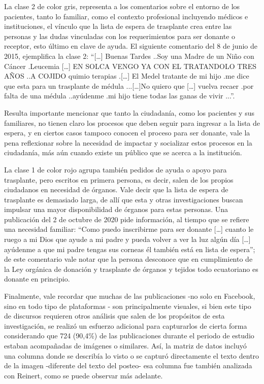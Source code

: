 \documentclass[spanish]{textolivre}
\begin{document}
La clase 2 de color gris, representa a los comentarios sobre el entorno de los pacientes, tanto lo familiar, como el contexto profesional incluyendo médicos e instituciones, el vínculo que la lista de espera de trasplante crea entre las personas y las dudas vinculadas con los requerimientos para ser donante o receptor, esto último en clave de ayuda. El siguiente comentario del 8 de junio de 2015, ejemplifica la clase 2: “[…] Buenas Tardes ..Soy una Madre de un Niño con Cáncer .Leucemia […] EN SOLCA VENGO YA CON EL TRATANDOLO TRES AÑOS ..A COJIDO quimio terapias .[…] El Medel tratante de mi hijo .me dice que esta para un trasplante de médula ...[…]No quiero que […] vuelva recaer .por falta de una médula ..ayúdenme .mi hijo tiene todas las ganas de vivir ...”.

Resulta importante mencionar que tanto la ciudadanía, como los pacientes y sus familiares, no tienen claro los procesos que deben seguir para ingresar a la lista de espera, y en ciertos casos tampoco conocen el proceso para ser donante, vale la pena reflexionar sobre la necesidad de impactar y socializar estos procesos en la ciudadanía, más aún cuando existe un público que se acerca a la institución.

La clase 1 de color rojo agrupa también pedidos de ayuda o apoyo para trasplante, pero escritos en primera persona, es decir, salen de los propios ciudadanos en necesidad de órganos. Vale decir que la lista de espera de trasplante es demasiado larga, de allí que esta y otras investigaciones buscan impulsar una mayor disponibilidad de órganos para estas personas. Una publicación del 2 de octubre de 2020 pide información, al tiempo que se refiere una necesidad familiar: “Como puedo inscribirme para ser donante […] cuanto le ruego a mi Dios que ayude a mi padre y pueda volver a ver la luz algún día […] ayúdenme a que mi padre tengas sus corneas él también está en lista de espera”; de este comentario vale notar que la persona desconoce que en cumplimiento de la Ley orgánica de donación y trasplante de órganos y tejidos todo ecuatoriano es donante en principio.

Finalmente, vale recordar que muchas de las publicaciones -no solo en Facebook, sino en todo tipo de plataformas \cite{cisco2016}- son principalmente visuales, si bien este tipo de discursos requieren otros análisis que salen de los propósitos de esta investigación, se realizó un esfuerzo adicional para capturarlos de cierta forma considerando que 724 (90,4\%) de las publicaciones durante el periodo de estudio estaban acompañadas de imágenes o similares. Así, la matriz de datos incluyó una columna donde se describía lo visto o se capturó directamente el texto dentro de la imagen -diferente del texto del posteo- esa columna fue también analizada con Reinert, como se puede observar más adelante. 
\end{document}
